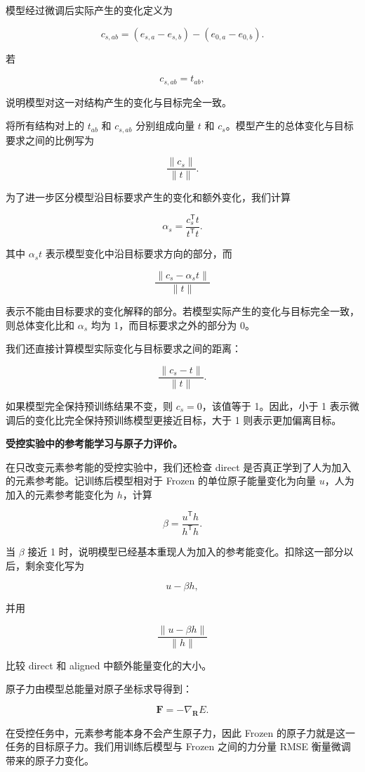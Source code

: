 \documentclass[UTF8,a4paper,12pt,fontset=fandol]{ctexart}
\begin{document}
模型经过微调后实际产生的变化定义为

\[
c_{s,ab}
=
(e_{s,a}-e_{s,b})
-
(e_{0,a}-e_{0,b}).
\]

若

\[
c_{s,ab}=t_{ab},
\]

说明模型对这一对结构产生的变化与目标完全一致。

将所有结构对上的 \(t_{ab}\) 和 \(c_{s,ab}\) 分别组成向量 \(t\) 和 \(c_s\)。模型产生的总体变化与目标要求之间的比例写为

\[
\frac{\|c_s\|}{\|t\|}.
\]

为了进一步区分模型沿目标要求产生的变化和额外变化，我们计算

\[
\alpha_s
=
\frac{c_s^{\mathsf T}t}{t^{\mathsf T}t}.
\]

其中 \(\alpha_s t\) 表示模型变化中沿目标要求方向的部分，而

\[
\frac{\|c_s-\alpha_s t\|}{\|t\|}
\]

表示不能由目标要求的变化解释的部分。若模型实际产生的变化与目标完全一致，则总体变化比和 \(\alpha_s\) 均为 1，而目标要求之外的部分为 0。

我们还直接计算模型实际变化与目标要求之间的距离：

\[
\frac{\|c_s-t\|}{\|t\|}.
\]

如果模型完全保持预训练结果不变，则 \(c_s=0\)，该值等于 1。因此，小于 1 表示微调后的变化比完全保持预训练模型更接近目标，大于 1 则表示更加偏离目标。


\textbf{受控实验中的参考能学习与原子力评价。}

在只改变元素参考能的受控实验中，我们还检查 direct 是否真正学到了人为加入的元素参考能。记训练后模型相对于 Frozen 的单位原子能量变化为向量 \(u\)，人为加入的元素参考能变化为 \(h\)，计算

\[
\beta
=
\frac{u^{\mathsf T}h}{h^{\mathsf T}h}.
\]

当 \(\beta\) 接近 1 时，说明模型已经基本重现人为加入的参考能变化。扣除这一部分以后，剩余变化写为

\[
u-\beta h,
\]

并用

\[
\frac{\|u-\beta h\|}{\|h\|}
\]

比较 direct 和 aligned 中额外能量变化的大小。

原子力由模型总能量对原子坐标求导得到：

\[
\mathbf F
=
-\nabla_{\mathbf R}E.
\]

在受控任务中，元素参考能本身不会产生原子力，因此 Frozen 的原子力就是这一任务的目标原子力。我们用训练后模型与 Frozen 之间的力分量 RMSE 衡量微调带来的原子力变化。
\end{document}
